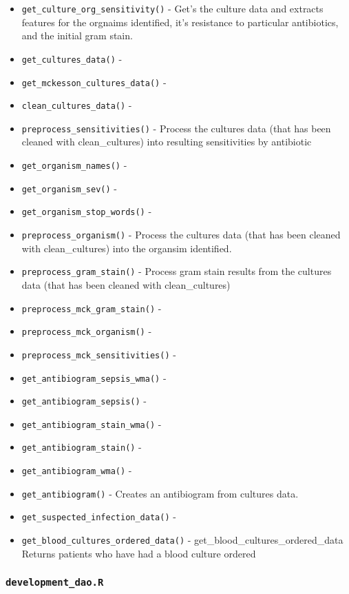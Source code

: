 \documentclass[
]{book}
\providecommand{\tightlist}{%
  \setlength{\itemsep}{0pt}\setlength{\parskip}{0pt}}
\begin{document}
\begin{itemize}
\tightlist
\item
  \texttt{get\_culture\_org\_sensitivity()} - Get's the culture data and extracts features for the orgnaims identified, it's resistance to particular antibiotics, and the initial gram stain.
\item
  \texttt{get\_cultures\_data()} -
\item
  \texttt{get\_mckesson\_cultures\_data()} -
\item
  \texttt{clean\_cultures\_data()} -
\item
  \texttt{preprocess\_sensitivities()} - Process the cultures data (that has been cleaned with clean\_cultures) into resulting sensitivities by antibiotic
\item
  \texttt{get\_organism\_names()} -
\item
  \texttt{get\_organism\_sev()} -
\item
  \texttt{get\_organism\_stop\_words()} -
\item
  \texttt{preprocess\_organism()} - Process the cultures data (that has been cleaned with clean\_cultures) into the organsim identified.
\item
  \texttt{preprocess\_gram\_stain()} - Process gram stain results from the cultures data (that has been cleaned with clean\_cultures)
\item
  \texttt{preprocess\_mck\_gram\_stain()} -
\item
  \texttt{preprocess\_mck\_organism()} -
\item
  \texttt{preprocess\_mck\_sensitivities()} -
\item
  \texttt{get\_antibiogram\_sepsis\_wma()} -
\item
  \texttt{get\_antibiogram\_sepsis()} -
\item
  \texttt{get\_antibiogram\_stain\_wma()} -
\item
  \texttt{get\_antibiogram\_stain()} -
\item
  \texttt{get\_antibiogram\_wma()} -
\item
  \texttt{get\_antibiogram()} - Creates an antibiogram from cultures data.
\item
  \texttt{get\_suspected\_infection\_data()} -
\item
  \texttt{get\_blood\_cultures\_ordered\_data()} - get\_blood\_cultures\_ordered\_data Returns patients who have had a blood culture ordered
\end{itemize}

\hypertarget{development_dao.r}{%
\subsubsection{\texorpdfstring{\texttt{development\_dao.R}}{development\_dao.R}}\label{development_dao.r}}
\end{document}
